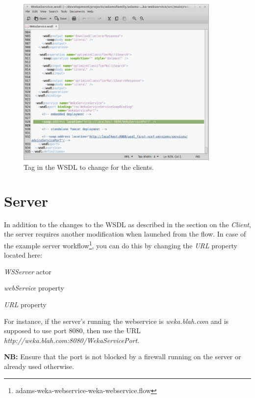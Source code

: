 \documentclass[a4paper]{book}
\begin{document}
\begin{figure}[htb]
  \centering
  \includegraphics[width=10.0cm]{images/client_setup.png}
  \caption{Tag in the WSDL to change for the clients.}
  \label{client_setup}
\end{figure}

\clearpage
\section{Server}
In addition to the changes to the WSDL as described in the section on the 
\textit{Client}, the server requires another modification
when launched from the flow. In case of the example server 
workflow\footnote{adams-weka-webservice-weka-webservice.flow},
you can do this by changing the \textit{URL} property located here:
\begin{tight_itemize}
	\item \textit{WSServer} actor
	\item \textit{webService} property
	\item \textit{URL} property
\end{tight_itemize}
For instance, if the server's running the webservice is \textit{weka.blah.com}
and is supposed to use port 8080, then use the URL 
\textit{http://weka.blah.com:8080/WekaServicePort}. 

\textbf{NB:} Ensure that the port is not blocked by a firewall running on the server
or already used otherwise.
\end{document}
